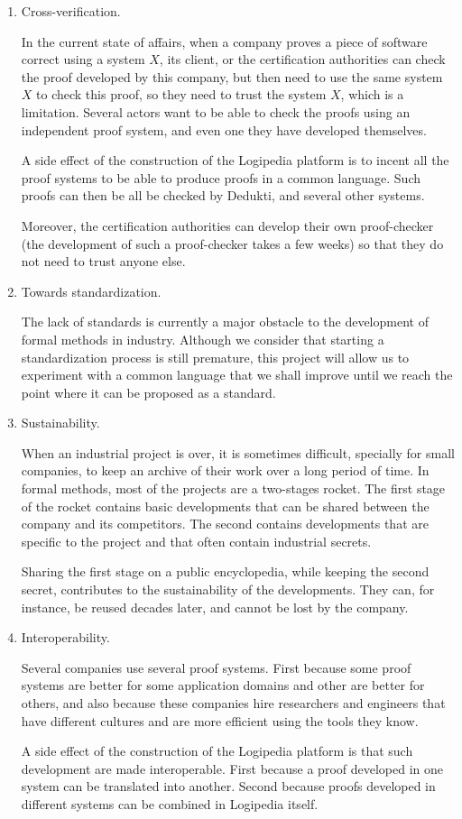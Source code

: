 \begin{enumerate}
\item Cross-verification.

In the current state of affairs, when a company proves a piece of
software correct using a system $X$, its client, or the certification
authorities can check the proof developed by this company, but then
need to use the same system $X$ to check this proof, so they need to
trust the system $X$, which is a limitation. Several actors want to be
able to check the proofs using an independent proof system, and even
one they have developed themselves.

A side effect of the construction of the {\sf Logipedia} platform is
to incent all the proof systems to be able to produce proofs in a
common language. Such proofs can then be all be checked by {\sf
Dedukti}, and several other systems.

Moreover, the certification authorities can develop their own
proof-checker (the development of such a proof-checker takes a few
weeks) so that they do not need to trust anyone else.

\item Towards standardization.

The lack of standards is currently a major obstacle to the development
of formal methods in industry. Although we consider that starting a
standardization process is still premature, this project will allow us
to experiment with a common language that we shall improve until we
reach the point where it can be proposed as a standard.

\item Sustainability.

When an industrial project is over, it is sometimes difficult,
specially for small companies, to keep an archive of their work over
a long period of time. In formal methods, most of the projects are a
two-stages rocket. The first stage of the rocket contains basic
developments that can be shared between the company and its
competitors. The second contains developments that are specific to the
project and that often contain industrial secrets.

Sharing the first stage on a public encyclopedia, while keeping the
second secret, contributes to the sustainability of the
developments. They can, for instance, be reused decades later, and
cannot be lost by the company.

\item Interoperability.

Several companies use several proof systems. First because some proof
systems are better for some application domains and other are better
for others, and also because these companies hire researchers and
engineers that have different cultures and are more efficient using the
tools they know.

A side effect of the construction of the {\sf Logipedia} platform is
that such development are made interoperable. First because a proof
developed in one system can be translated into another. Second because
proofs developed in different systems can be combined in {\sf
Logipedia} itself.
\end{enumerate}

